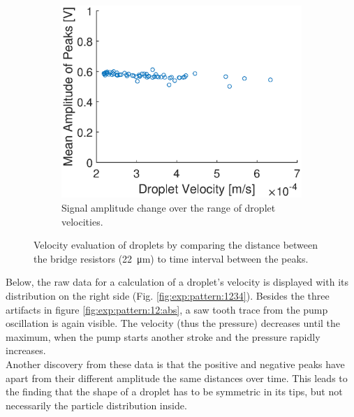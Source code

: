 \begin{figure}[h]
\begin{subfigure}[r]{0.49\textwidth}
		\includegraphics[clip,trim={0mm 0mm 0mm 0mm}, width=1.1\linewidth]{Ressourcen/Results/Measurement/Vel-Amp}
		\caption{Signal amplitude change over the range of droplet velocities.}
		\label{fig:exp:pattern:vel:amp}
	\end{subfigure}
	\caption{Velocity evaluation of droplets by comparing the distance between the bridge resistors (\SI{22}{\micro\meter}) to time interval between the peaks.}
\end{figure}
\clearpage

Below, the raw data for a calculation of a droplet's velocity is displayed with its distribution on the right side (Fig. \ref{fig:exp:pattern:1234}). Besides the three artifacts in figure \ref{fig:exp:pattern:12:abs}, a saw tooth trace from the pump oscillation is again visible. The velocity (thus the pressure) decreases until the maximum, when the pump starts another stroke and the pressure rapidly increases. \\
Another discovery from these data is that the positive and negative peaks have apart from their different amplitude the same distances over time. This leads to the finding that the shape of a droplet has to be symmetric in its tips, but not necessarily the particle distribution inside.

